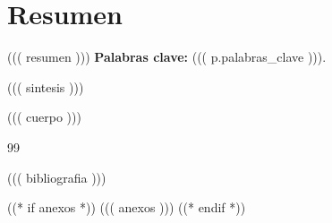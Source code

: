 \documentclass[11pt,a4paper]{article}
\begin{document}
\setcounter{page}{2}
\section*{Resumen}
((( resumen )))
\medskip
\noindent\textbf{Palabras clave:} ((( p.palabras_clave ))).

\vspace{0.4cm}
((( sintesis )))

\newpage
{\small\tableofcontents}
\newpage

((( cuerpo )))

\begin{thebibliography}{99}
\small
((( bibliografia )))
\end{thebibliography}

((* if anexos *))
\appendix
((( anexos )))
((* endif *))
\end{document}
